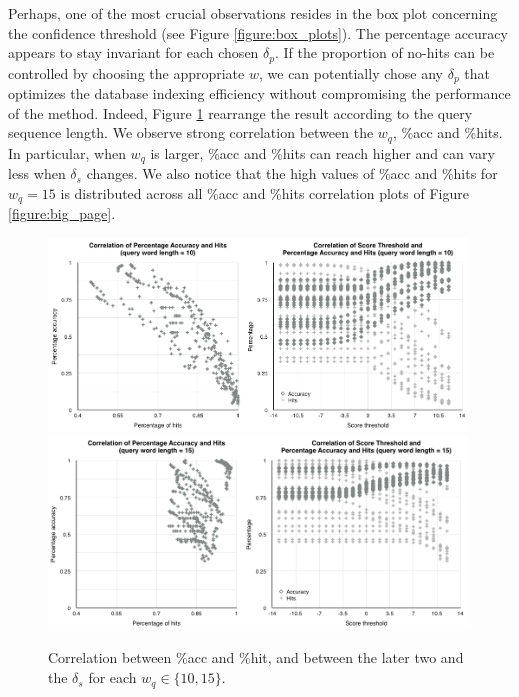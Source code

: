 \documentclass{article}
\begin{document}
Perhaps, one of the most crucial observations resides in the box plot concerning the confidence threshold (see Figure \ref{figure:box_plots}). The percentage accuracy appears to stay invariant for each chosen $\delta_p$. If the proportion of no-hits can be controlled by choosing the appropriate $w$, we can potentially chose any $\delta_p$ that optimizes the database indexing efficiency without compromising the performance of the method. Indeed, Figure \ref{figure:small_page} rearrange the result according to the query sequence length. We observe strong correlation between the $w_q$, \%acc and \%hits. In particular, when $w_q$ is larger, \%acc and \%hits can reach higher and can vary less when $\delta_s$ changes. We also notice that the high values of \%acc and \%hits for $w_q=15$ is distributed across all \%acc and \%hits correlation plots of Figure \ref{figure:big_page}. 

\begin{figure}[tbp]
\begin{center}
\caption{Correlation between \%acc and \%hit, and between the later two and the $\delta_s$ for each $w_q \in \{10, 15\}$.}
  \includegraphics[width=0.99\textwidth]{10}
   \includegraphics[width=0.99\textwidth]{15}
\label{figure:small_page}
\end{center}
\end{figure}
\end{document}
